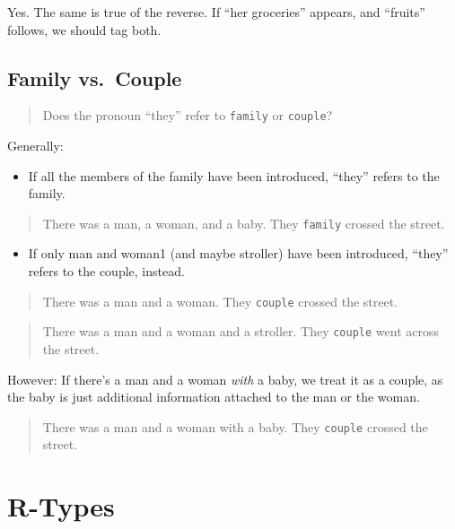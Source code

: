 \documentclass[
]{book}
\providecommand{\tightlist}{%
  \setlength{\itemsep}{0pt}\setlength{\parskip}{0pt}}
\begin{document}
Yes. The same is true of the reverse.
If ``her groceries'' appears, and ``fruits'' follows, we should tag both.

\hypertarget{family-vs.-couple}{%
\subsection{Family vs.~Couple}\label{family-vs.-couple}}

\begin{quote}
Does the pronoun ``they'' refer to \texttt{family} or \texttt{couple}?
\end{quote}

Generally:

\begin{itemize}
\tightlist
\item
  If all the members of the family have been introduced,
  ``they'' refers to the family.
\end{itemize}

\begin{quote}
There was a man, a woman, and a baby.
They \texttt{family} crossed the street.
\end{quote}

\begin{itemize}
\tightlist
\item
  If only man and woman1 (and maybe stroller) have been introduced,
  ``they'' refers to the couple, instead.
\end{itemize}

\begin{quote}
There was a man and a woman.
They \texttt{couple} crossed the street.
\end{quote}

\begin{quote}
There was a man and a woman and a stroller.
They \texttt{couple} went across the street.
\end{quote}

However: If there's a man and a woman \emph{with} a baby,
we treat it as a couple,
as the baby is just additional information
attached to the man or the woman.

\begin{quote}
There was a man and a woman with a baby.
They \texttt{couple} crossed the street.
\end{quote}

\hypertarget{r-types}{%
\section{R-Types}\label{r-types}}
\end{document}
